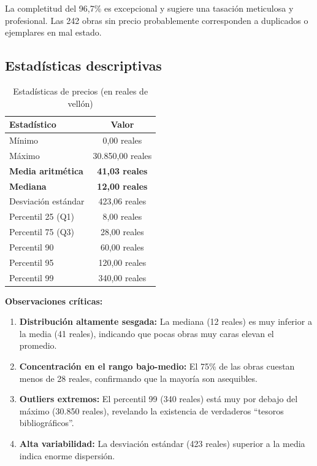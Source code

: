 \documentclass[12pt,a4paper]{article}
\begin{document}
La completitud del 96,7\% es excepcional y sugiere una tasación meticulosa y profesional. Las 242 obras sin precio probablemente corresponden a duplicados o ejemplares en mal estado.

\subsection{Estadísticas descriptivas}

\begin{table}[h]
\centering
\caption{Estadísticas de precios (en reales de vellón)}
\begin{tabular}{lc}
\toprule
\textbf{Estadístico} & \textbf{Valor} \\
\midrule
Mínimo & 0,00 reales \\
Máximo & 30.850,00 reales \\
\textbf{Media aritmética} & \textbf{41,03 reales} \\
\textbf{Mediana} & \textbf{12,00 reales} \\
Desviación estándar & 423,06 reales \\
\midrule
Percentil 25 (Q1) & 8,00 reales \\
Percentil 75 (Q3) & 28,00 reales \\
Percentil 90 & 60,00 reales \\
Percentil 95 & 120,00 reales \\
Percentil 99 & 340,00 reales \\
\bottomrule
\end{tabular}
\end{table}

\textbf{Observaciones críticas:}

\begin{enumerate}
    \item \textbf{Distribución altamente sesgada:} La mediana (12 reales) es muy inferior a la media (41 reales), indicando que pocas obras muy caras elevan el promedio.

    \item \textbf{Concentración en el rango bajo-medio:} El 75\% de las obras cuestan menos de 28 reales, confirmando que la mayoría son asequibles.

    \item \textbf{Outliers extremos:} El percentil 99 (340 reales) está muy por debajo del máximo (30.850 reales), revelando la existencia de verdaderos ``tesoros bibliográficos''.

    \item \textbf{Alta variabilidad:} La desviación estándar (423 reales) superior a la media indica enorme dispersión.
\end{enumerate}
\end{document}
